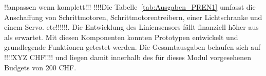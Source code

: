 \documentclass[main.tex]{subfiles} %
\begin{document}
!!anpassen wenn komplett!!!
!!!!Die Tabelle~\ref{tab:Ausgaben_PREN1} umfasst die Anschaffung von Schrittmotoren, Schrittmotorentreibern, einer 
Lichtschranke und einem Servo. etc!!!!!!. Die Entwicklung des Liniensensors fällt finanziell höher aus als erwartet.
Mit diesen Komponenten konnten Prototypen entwickelt und grundlegende 
Funktionen getestet werden. Die Gesamtausgaben belaufen sich auf !!!!XYZ CHF!!!! und liegen damit innerhalb des 
für dieses Modul vorgesehenen Budgets von 200 CHF.
\end{document}
